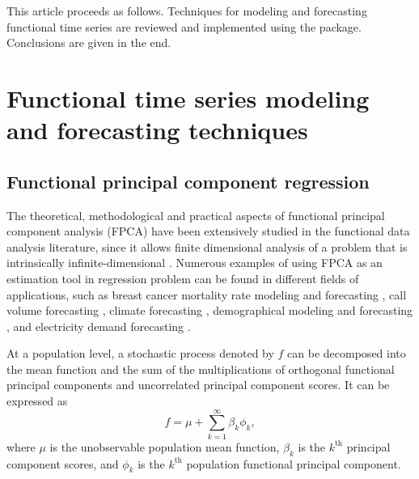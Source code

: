 \documentclass[nojss]{jss}
\begin{document}
This article proceeds as follows. Techniques for modeling and forecasting functional time series are reviewed and implemented using the  package. Conclusions are given in the end.


\section*{Functional time series modeling and forecasting techniques}\label{sec:3}

\subsection*{Functional principal component regression}

The theoretical, methodological and practical aspects of functional principal component analysis (FPCA) have been extensively studied in the functional data analysis literature, since it allows finite dimensional analysis of a problem that is intrinsically infinite-dimensional \citep{HH06}. Numerous examples of using FPCA as an estimation tool in regression problem can be found in different fields of applications, such as breast cancer mortality rate modeling and forecasting \citep{EHG07}, call volume forecasting \citep{SH08}, climate forecasting \citep{SH11}, demographical modeling and forecasting \citep{HS09}, and electricity demand forecasting \citep{APD+08}.

At a population level, a stochastic process denoted by $f$ can be decomposed into the mean function and the sum of the multiplications of orthogonal functional principal components and uncorrelated principal component scores. It can be expressed as
\begin{equation*}
f = \mu + \sum^{\infty}_{k=1}\beta_{k}\phi_k,
\end{equation*}
where $\mu$ is the unobservable population mean function, $\beta_{k}$ is the $k^{\text{th}}$ principal component scores, and $\phi_k$ is the $k^{\text{th}}$ population functional principal component.
\end{document}

